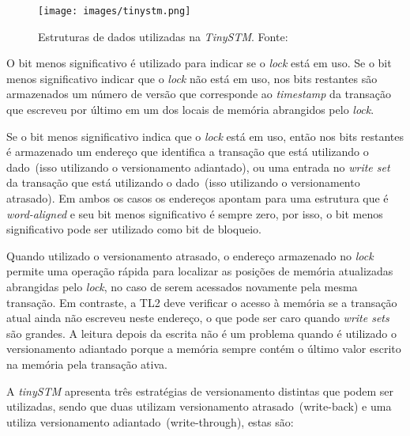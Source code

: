\documentclass[diss,capa]{texufpel}
\begin{document}

\begin{figure}[!htp]
\centering
\texttt{[image: images/tinystm.png]}
\caption{Estruturas de dados utilizadas na \emph{TinySTM}. Fonte:~\cite{TINY}}
\label{figurasincronisacaotinystm}
\end{figure}

O bit menos significativo é utilizado para indicar se o \emph{lock} está em uso. Se o bit menos significativo indicar que o \emph{lock} não está em uso, nos bits restantes são armazenados um número de versão que corresponde ao \emph{timestamp} da transação que escreveu por último em um dos locais de memória abrangidos pelo \emph{lock}.

Se o bit menos significativo indica que o \emph{lock} está em uso, então nos bits restantes é armazenado um endereço que identifica a transação que está utilizando o dado~(isso utilizando o versionamento adiantado), ou uma entrada no \emph{write set} da transação que está utilizando o dado~(isso utilizando o versionamento atrasado). Em ambos os casos os endereços apontam para uma estrutura que é \emph{word-aligned} e seu bit menos significativo é sempre zero, por isso, o bit menos significativo pode ser utilizado como bit de bloqueio.

Quando utilizado o versionamento atrasado, o endereço armazenado no \emph{lock} permite uma operação rápida para localizar as posições de memória atualizadas abrangidas pelo \emph{lock}, no caso de serem acessados novamente pela mesma transação. Em contraste, a TL2 deve verificar o acesso à memória se a transação atual ainda não escreveu neste endereço, o que pode ser caro quando \emph{write sets} são grandes. A leitura depois da escrita não é um problema quando é utilizado o versionamento adiantado porque a memória sempre contém o último valor escrito na memória pela transação ativa.

A \emph{tinySTM} apresenta três estratégias de versionamento distintas que podem ser utilizadas, sendo que duas utilizam versionamento atrasado~(write-back) e uma utiliza versionamento adiantado~(write-through), estas são:
\end{document}
